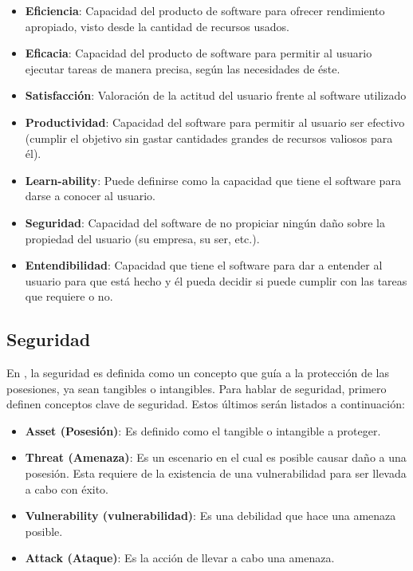 \begin{itemize}
 \item \textbf{Eficiencia}: Capacidad del producto de software para ofrecer rendimiento apropiado, visto desde la cantidad de recursos usados.
 \item \textbf{Eficacia}: Capacidad del producto de software para permitir al usuario ejecutar tareas de manera precisa, según las necesidades de éste.
 \item \textbf{Satisfacción}: Valoración de la actitud del usuario frente al software utilizado
 \item \textbf{Productividad}: Capacidad del software para permitir al usuario ser efectivo (cumplir el objetivo sin gastar cantidades grandes de recursos valiosos para él).
 \item \textbf{Learn-ability}: Puede definirse como la capacidad que tiene el software para darse a conocer al usuario.
 \item \textbf{Seguridad}: Capacidad del software de no propiciar ningún daño sobre la propiedad del usuario (su empresa, su ser, etc.).
 \item \textbf{Entendibilidad}: Capacidad que tiene el software para dar a entender al usuario para que está hecho y él pueda decidir si puede cumplir con las tareas que requiere o no.
\end{itemize}

\subsection{Seguridad}

En \cite{security_ws}, la seguridad es definida como un concepto que guía a la protección de las posesiones, ya sean tangibles o intangibles. Para hablar de seguridad, primero definen conceptos clave de seguridad. Estos últimos serán listados a continuación:

\begin{itemize}
 \item \textbf{Asset (Posesión)}: Es definido como el tangible o intangible a proteger.
 \item \textbf{Threat (Amenaza)}: Es un escenario en el cual es posible causar daño a una posesión. Esta requiere de la existencia de una vulnerabilidad para ser llevada a cabo con éxito.
 \item \textbf{Vulnerability (vulnerabilidad)}: Es una debilidad que hace una amenaza posible.
 \item \textbf{Attack (Ataque)}: Es la acción de llevar a cabo una amenaza.
\end{itemize}

